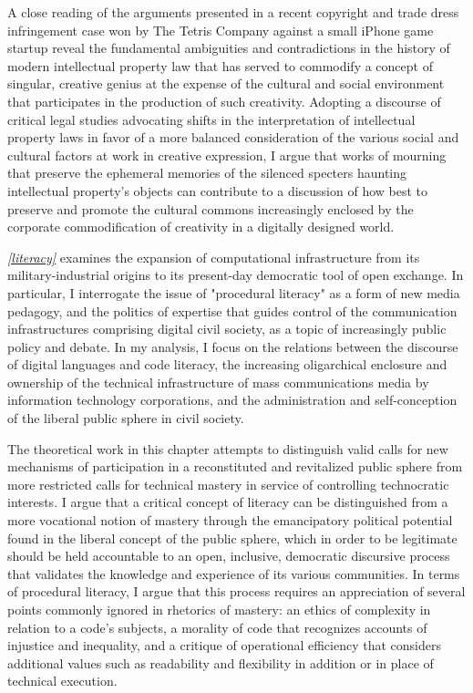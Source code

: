 A close reading of the arguments presented in a recent copyright and trade dress infringement case won by The Tetris Company against a small iPhone game startup reveal the fundamental ambiguities and contradictions in the history of modern intellectual property law that has served to commodify a concept of singular, creative genius at the expense of the cultural and social environment that participates in the production of such creativity. Adopting a discourse of critical legal studies advocating shifts in the interpretation of intellectual property laws in favor of a more balanced consideration of the various social and cultural factors at work in creative expression, I argue that works of mourning that preserve the ephemeral memories of the silenced specters haunting intellectual property's objects can contribute to a discussion of how best to preserve and promote the cultural commons increasingly enclosed by the corporate commodification of creativity in a digitally designed world.

\emph{\cref{literacy}} examines the expansion of computational infrastructure from its military-industrial origins to its present-day democratic tool of open exchange. In particular, I interrogate the issue of "procedural literacy" as a form of new media pedagogy, and the politics of expertise that guides control of the communication infrastructures comprising digital civil society, as a topic of increasingly public policy and debate. In my analysis, I focus on the relations between the discourse of digital languages and code literacy, the increasing oligarchical enclosure and ownership of the technical infrastructure of mass communications media by information technology corporations, and the administration and self-conception of the liberal public sphere in civil society.

The theoretical work in this chapter attempts to distinguish valid calls for new mechanisms of participation in a reconstituted and revitalized public sphere from more restricted calls for technical mastery in service of controlling technocratic interests. I argue that a critical concept of literacy can be distinguished from a more vocational notion of mastery through the emancipatory political potential found in the liberal concept of the public sphere, which in order to be legitimate should be held accountable to an open, inclusive, democratic discursive process that validates the knowledge and experience of its various communities. In terms of procedural literacy, I argue that this process requires an appreciation of several points commonly ignored in rhetorics of mastery: an ethics of complexity in relation to a code's subjects, a morality of code that recognizes accounts of injustice and inequality, and a critique of operational efficiency that considers additional values such as readability and flexibility in addition or in place of technical execution.

